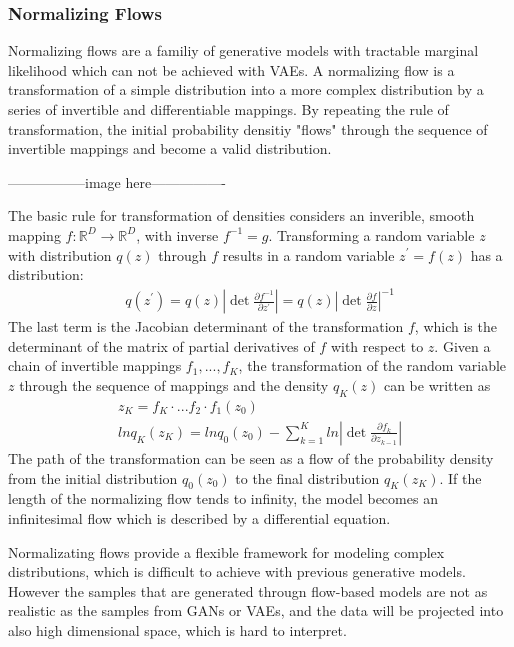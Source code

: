 \documentclass[12pt,DIV14,BCOR12mm,a4paper,footinclude=false,headinclude,parskip=half-,twoside,openright,cleardoublepage=empty,toc=index,bibliography=totoc,listof=totoc]{scrreprt}
\numberwithin{equation}{chapter}
\begin{document}
\subsubsection{Normalizing Flows}
Normalizing flows\cite{rezende2016variational} are a familiy of generative models with tractable marginal likelihood which can not be achieved with VAEs.
A normalizing flow is a transformation of a simple distribution into a more complex distribution by a series of invertible and differentiable mappings.
By repeating the rule of transformation, the initial probability densitiy "flows" through the sequence of invertible mappings and become a valid distribution.

-----------------image here----------------

The basic rule for transformation of densities considers an inverible, smooth mapping $f: \mathbb{R}^{D} \rightarrow \mathbb{R}^{D}$,
with inverse $f^{-1} = g$. Transforming a random variable $z$ with distribution $q(z)$ through $f$ results in a random variable $z^{'}  = f(z)$ has a distribution:
\begin{align}
  q(z^{'}) = q(z) \left| \det \frac{\partial f^{-1}}{\partial z^{'}} \right| = q(z) \left| \det \frac{\partial f}{\partial z} \right|^{-1}
\end{align}
The last term is the Jacobian determinant of the transformation $f$, which is the determinant of the matrix of partial derivatives of $f$ with respect to $z$.
Given a chain of invertible mappings $f_{1},...,f_{K}$, the transformation of the random variable $z$ through the sequence of mappings 
and the density $q_{K}(z)$ can be written as
\begin{gather}
  z_{K} = f_{K} \cdot ... f_{2} \cdot f_{1}(z_{0})\\
  lnq_{K}(z_{K}) = lnq_{0}(z_{0}) - \sum_{k=1}^{K} ln \left| \det \frac{\partial f_{k}}{\partial z_{k-1}} \right|
\end{gather}
The path of the transformation can be seen as a flow of the probability density from the initial distribution $q_{0}(z_{0})$ to the final distribution $q_{K}(z_{K})$.
If the length of the normalizing flow tends to infinity, the model becomes an infinitesimal flow which is described by a differential equation.

Normalizating flows provide a flexible framework for modeling complex distributions, which is difficult to achieve with previous generative models.
However the samples that are generated througn flow-based models are not as realistic as the samples from GANs or VAEs, 
and the data will be projected into also high dimensional space, which is hard to interpret.
\end{document}
